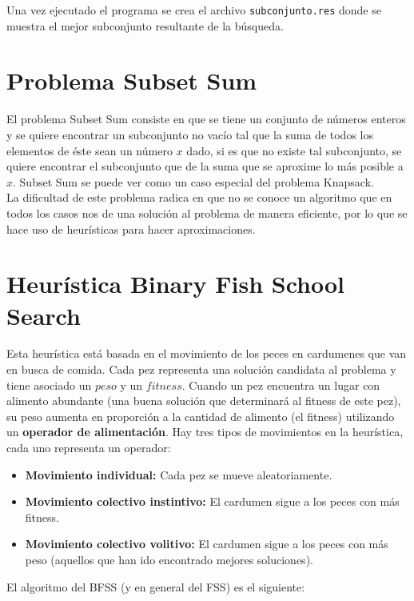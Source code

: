 \documentclass[12pt]{article}
\begin{document}
Una vez ejecutado el programa se crea el archivo \texttt{subconjunto.res} donde se muestra el mejor subconjunto resultante de la búsqueda.

\newpage

\section{Problema Subset Sum} \label{sec:ss}
El problema Subset Sum consiste en que se tiene un conjunto de números enteros y se quiere encontrar un subconjunto no vacío tal que la suma de todos los elementos de éste sean un número $x$ dado, si es que no existe tal subconjunto, se quiere encontrar el subconjunto que de la suma que se aproxime lo más posible a $x$. Subset Sum se puede ver como un caso especial del problema Knapsack. \\

La dificultad de este problema radica en que no se conoce un algoritmo que en todos los casos nos de una solución al problema de manera eficiente, por lo que se hace uso de heurísticas para hacer aproximaciones.

\section{Heurística Binary Fish School Search } \label{sec:bfss} 
Esta heurística está basada en el movimiento de los peces en cardumenes que van en busca de comida. Cada pez representa una solución candidata al problema y tiene asociado un $peso$ y un $fitness$. Cuando un pez encuentra un lugar con alimento abundante (una buena solución que determinará al fitness de este pez), su peso aumenta en proporción a la cantidad de alimento (el fitness) utilizando un \textbf{operador de alimentación}. Hay tres tipos de movimientos en la heurística, cada uno representa un operador:
\begin{itemize}
\item \textbf{Movimiento individual:} Cada pez se mueve aleatoriamente.
\item \textbf{Movimiento colectivo instintivo:} El cardumen sigue a los peces con más fitness.
\item \textbf{Movimiento colectivo volitivo:} El cardumen sigue a los peces con más peso (aquellos que han ido encontrado mejores soluciones).
\end{itemize}

El algoritmo del BFSS (y en general del FSS) es el siguiente: 
\end{document}
